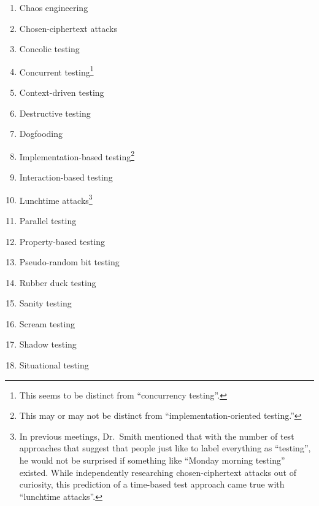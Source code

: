 \begin{minipage}{0.92\textwidth}
    \centering
    \begin{multicols}{2}
        \begin{enumerate}
            \item Chaos engineering
            \item Chosen-ciphertext attacks
            \item Concolic testing
            \item Concurrent testing\footnote{This seems to be distinct from
                      ``concurrency testing''.}
            \item Context-driven testing
            \item Destructive testing
            \item Dogfooding
            \item Implementation-based testing\footnote{This may or may not be
                      distinct from ``implementation-oriented testing.''}
            \item Interaction-based testing
            \item Lunchtime attacks\footnote{In previous meetings, Dr.~Smith
                      mentioned that with the number of test approaches that
                      suggest that people just like to label everything as
                      ``testing'', he would not be surprised if something
                      like ``Monday morning testing'' existed. While
                      independently researching chosen-ciphertext attacks
                      out of curiosity, this prediction of a time-based
                      test approach came true with ``lunchtime attacks''.}
            \item Parallel testing
            \item Property-based testing
            \item Pseudo-random bit testing
            \item Rubber duck testing
            \item Sanity testing
            \item Scream testing
            \item Shadow testing
            \item Situational testing
        \end{enumerate}
    \end{multicols}
\end{minipage}

